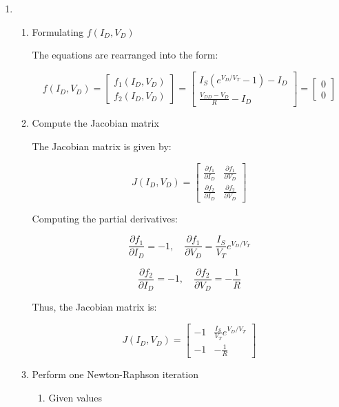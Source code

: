 \documentclass[12pt]{article}
\begin{document}
\begin{enumerate}
\item 
\begin{enumerate}

    \item Formulating \( f(I_D, V_D) \)
    
    The equations are rearranged into the form:

    \[
    f(I_D, V_D) =
    \begin{bmatrix}
    f_1(I_D, V_D) \\
    f_2(I_D, V_D)
    \end{bmatrix}
    =
    \begin{bmatrix}
    I_S \left(e^{V_D / V_T} - 1 \right) - I_D \\
    \frac{V_{DD} - V_D}{R} - I_D
    \end{bmatrix}
    =
    \begin{bmatrix}
    0 \\
    0
    \end{bmatrix}
    \]

    \item Compute the Jacobian matrix
    
    The Jacobian matrix is given by:

    \[
    J(I_D, V_D) =
    \begin{bmatrix}
    \frac{\partial f_1}{\partial I_D} & \frac{\partial f_1}{\partial V_D} \\
    \frac{\partial f_2}{\partial I_D} & \frac{\partial f_2}{\partial V_D}
    \end{bmatrix}
    \]

    Computing the partial derivatives:

    \[
    \frac{\partial f_1}{\partial I_D} = -1, \quad
    \frac{\partial f_1}{\partial V_D} = \frac{I_S}{V_T} e^{V_D / V_T}
    \]

    \[
    \frac{\partial f_2}{\partial I_D} = -1, \quad
    \frac{\partial f_2}{\partial V_D} = -\frac{1}{R}
    \]

    Thus, the Jacobian matrix is:

    \[
    J(I_D, V_D) =
    \begin{bmatrix}
    -1 & \frac{I_S}{V_T} e^{V_D / V_T} \\
    -1 & -\frac{1}{R}
    \end{bmatrix}
    \]

    \item Perform one Newton-Raphson iteration
    
    \begin{enumerate}
        \item Given values
        

\end{enumerate}
\end{enumerate}
\end{enumerate}
\end{document}
